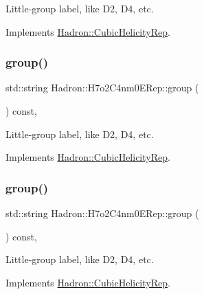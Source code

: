 Little-\/group label, like D2, D4, etc. 

Implements \mbox{\hyperlink{structHadron_1_1CubicHelicityRep_a101a7d76cd8ccdad0f272db44b766113}{Hadron\+::\+Cubic\+Helicity\+Rep}}.

\mbox{\label{structHadron_1_1H7o2C4nm0ERep_ae7293b4f57a530ceb630b43a1036f5c4}} 
\subsubsection{\texorpdfstring{group()}{group()}\hspace{0.1cm}{\footnotesize\ttfamily [2/3]}}
{\footnotesize\ttfamily std\+::string Hadron\+::\+H7o2\+C4nm0\+E\+Rep\+::group (\begin{DoxyParamCaption}{ }\end{DoxyParamCaption}) const\hspace{0.3cm}{\ttfamily [inline]}, {\ttfamily [virtual]}}

Little-\/group label, like D2, D4, etc. 

Implements \mbox{\hyperlink{structHadron_1_1CubicHelicityRep_a101a7d76cd8ccdad0f272db44b766113}{Hadron\+::\+Cubic\+Helicity\+Rep}}.

\mbox{\label{structHadron_1_1H7o2C4nm0ERep_ae7293b4f57a530ceb630b43a1036f5c4}} 
\subsubsection{\texorpdfstring{group()}{group()}\hspace{0.1cm}{\footnotesize\ttfamily [3/3]}}
{\footnotesize\ttfamily std\+::string Hadron\+::\+H7o2\+C4nm0\+E\+Rep\+::group (\begin{DoxyParamCaption}{ }\end{DoxyParamCaption}) const\hspace{0.3cm}{\ttfamily [inline]}, {\ttfamily [virtual]}}

Little-\/group label, like D2, D4, etc. 

Implements \mbox{\hyperlink{structHadron_1_1CubicHelicityRep_a101a7d76cd8ccdad0f272db44b766113}{Hadron\+::\+Cubic\+Helicity\+Rep}}.

